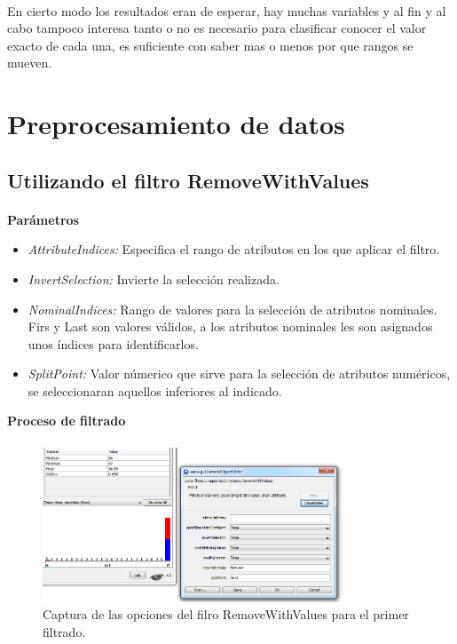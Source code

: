 \documentclass[es]{ifirak}
\begin{document}
\paragraph{}
En cierto modo los resultados eran de esperar, hay muchas variables y al fin y al cabo tampoco interesa tanto o no es necesario para clasificar conocer el valor exacto de cada una, es suficiente con saber mas o menos por que rangos se mueven.


\section{Preprocesamiento de datos}

\subsection{Utilizando el filtro RemoveWithValues}
\paragraph{}
\textbf{Parámetros}

\begin{itemize}
\item \emph{AttributeIndices:} Especifica el rango de atributos en los que aplicar el filtro.
\item \emph{InvertSelection:} Invierte la selección realizada.
\item \emph{NominalIndices:} Rango de valores para la selección de atributos nominales. Firs y Last son valores válidos, a los atributos nominales les son asignados unos índices para identificarlos.
\item \emph{SplitPoint:} Valor númerico que sirve para la selección de atributos numéricos, se seleccionaran aquellos inferiores al indicado.
\end{itemize}

\textbf{Proceso de filtrado}

\paragraph{}
\begin{figure}[htbp]
\centering
\includegraphics[width=0.8\textwidth]{PrimerFiltro.png}
\caption{Captura de las opciones del filro RemoveWithValues para el primer filtrado.}\label{figure}
\end{figure}
\end{document}
